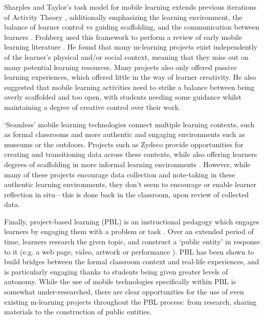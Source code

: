 Sharples and Taylor's task model for mobile learning extends previous iterations of Activity Theory \citep{Engestrom2001}, additionally emphasizing the learning environment, the balance of learner control vs guiding scaffolding, and the communication between learners \citep{Sharples2007}. Frohberg used this framework to perform a review of early mobile learning literature \citep{Frohberg2009}. He found that many m-learning projects exist independently of the learner's physical and/or social context, meaning that they miss out on many potential learning resources. Many projects also only offered passive learning experiences, which offered little in the way of learner creativity. He also suggested that mobile learning activities need to strike a balance between being overly scaffolded and too open, with students needing some guidance whilst maintaining a degree of creative control over their work.

`Seamless' mobile learning technologies connect multiple learning contexts, such as formal classrooms and more authentic and engaging environments such as museums or the outdoors. Projects such as Zydeco provide opportunities for creating and transitioning data across these contexts, while also offering learners degrees of scaffolding in more informal learning environments \citep{kuhn2011}. However, while many of these projects encourage data collection and note-taking in these authentic learning environments, they don't seem to encourage or enable learner reflection in situ---this is done back in the classroom, upon review of collected data.

Finally, project-based learning (PBL) is an instructional pedagogy which engages learners by engaging them with a problem or task \citep{Blumenfeld1991}. Over an extended period of time, learners research the given topic, and construct a `public entity' in response to it (e.g. a web page, video, artwork or performance \citep{Holubova2008}). PBL has been shown to build bridges between the formal classroom context and real-life experiences, and is particularly engaging thanks to students being given greater levels of autonomy. While the use of mobile technologies specifically within PBL is somewhat under-researched, there are clear opportunities for the use of even existing m-learning projects throughout the PBL process: from research, sharing materials to the construction of public entities.
